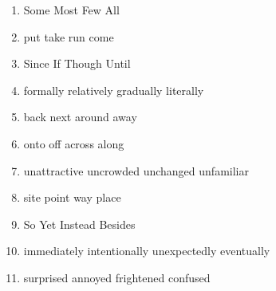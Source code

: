 \begin{enumerate}
	\item
\fourchoices
{Some}
{Most}
{Few}
{All}



\item

\fourchoices
{put}
{take}
{run}
{come}



\item

\fourchoices
{Since}
{If}
{Though}
{Until}




\item

\fourchoices
{formally}
{relatively}
{gradually}
{literally}



\item

\fourchoices
{back}
{next}
{around}
{away}



\item

\fourchoices
{onto}
{off}
{across}
{along}



\item

\fourchoices
{unattractive}
{uncrowded}
{unchanged}
{unfamiliar}


\item

\fourchoices
{site}
{point}
{way}
{place}



\item

\fourchoices
{So}
{Yet}
{Instead}
{Besides}




\item

\fourchoices
{immediately}
{intentionally}
{unexpectedly}
{eventually}




\item

\fourchoices
{surprised}
{annoyed}
{frightened}
{confused}




\end{enumerate}
